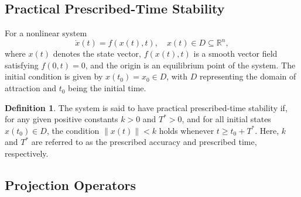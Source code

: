 \documentclass[]{interact}
\theoremstyle{plain}%
\theoremstyle{definition}
\newtheorem{definition}{Definition}
\theoremstyle{remark}
\begin{document}

 \subsection{Practical Prescribed-Time Stability}

 For a nonlinear system
 \begin{equation}
 \dot{x}(t) = f(x(t), t), \quad x(t) \in D \subseteq \mathbb{R}^n,
 \end{equation}
 where \( x(t) \) denotes the state vector,  \( f(x(t), t) \) is a smooth vector field satisfying \( f(0, t) = 0 \), and the origin is an equilibrium point of the system. The initial condition is given by \( x(t_0) = x_0 \in D \), with   \( D \) representing the domain of attraction and \( t_0 \) being the initial time.

\begin{definition}
\label{def:practical-pt}
\citep{Xu2024} The system is said to have practical prescribed-time stability if, for any given positive constants \( k > 0 \) and \( T^* > 0 \), and for all initial states \( x(t_0) \in D \), the condition \( \|x(t)\| < k \) holds whenever \( t \geq t_0 + T^* \). Here, \( k \) and \( T^* \) are referred to as the prescribed accuracy and prescribed time, respectively.
\end{definition}

\subsection{Projection Operators}
\end{document}

